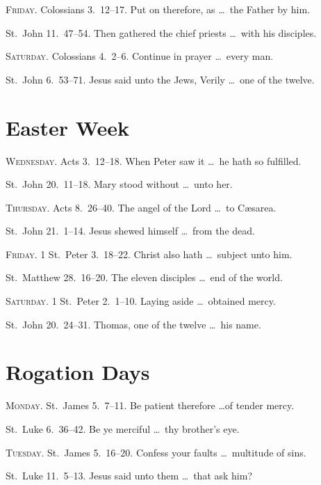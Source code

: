 {\scshape Friday.}  Colossians 3.~12–17.   Put on therefore, as \ldots\ the Father by him.

 St.~John 11.~47–54.   Then gathered the chief priests \ldots\ with his disciples.

{\scshape Saturday.}  Colossians 4.~2–6.   Continue in prayer \ldots\ every man.

 St.~John 6.~53–71.   Jesus said unto the Jews, Verily \ldots\ one of the twelve.

\section{Easter Week}

{\scshape Wednesday.}  Acts 3.~12–18.   When Peter saw it \ldots\ he hath so fulfilled.

 St.~John 20.~11–18.   Mary stood without \ldots\ unto her.


{\scshape Thursday.}  Acts 8.~26–40.   The angel of the Lord \ldots\ to Cæsarea.

 St.~John 21.~1–14.   Jesus shewed himself \ldots\ from the dead.

{\scshape Friday.}  1 St.~Peter 3.~18–22.   Christ also hath \ldots\ subject unto him.

 St.~Matthew 28.~16–20.   The eleven disciples \ldots\ end of the world.

{\scshape Saturday.}    1 St.~Peter 2.~1–10. Laying aside \ldots\ obtained mercy.

 St.~John 20.~24–31.   Thomas, one of the twelve \ldots\ his name.

\section{Rogation Days}

{\scshape Monday.}  St.~James 5.~7–11.   Be patient therefore \ldots of tender mercy.

 St.~Luke 6.~36–42.   Be ye merciful \ldots\ thy brother’s eye.

{\scshape Tuesday.}  St.~James 5.~16–20.   Confess your faults \ldots\ multitude of sins.

 St.~Luke 11.~5–13.   Jesus said unto them \ldots\ that ask him?


